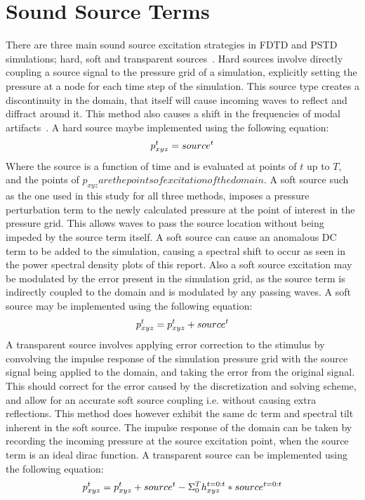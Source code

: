 \section{Sound Source Terms}
There are three main sound source excitation strategies in FDTD and PSTD simulations; hard, soft and transparent sources~\cite{Murphy2014}. Hard sources involve directly coupling a source signal to the pressure grid of a simulation, explicitly setting the pressure at a node for each time step of the simulation. This source type creates a discontinuity in the domain, that itself will cause incoming waves to reflect and diffract around it. This method also causes a shift in the frequencies of modal artifacts~\cite{Murphy2014}. A hard source maybe implemented using the following equation:\\
\begin{equation}
p_{xyz}^{t} = source^{t}\\
\end{equation}
Where the source is a function of time and is evaluated at points of $t$ up to $T$, and the points of $p_{xyz} are the points of excitation of the domain$.
A soft source such as the one used in this study for all three methods, imposes a pressure perturbation term to the newly calculated pressure at the point of interest in the pressure grid. This allows waves to pass the source location without being impeded by the source term itself. A soft source can cause an anomalous DC term to be added to the simulation, causing a spectral shift to occur as seen in the power spectral density plots of this report. Also a soft source excitation may be modulated by the error present in the simulation grid, as the source term is indirectly coupled to the domain and is modulated by any passing waves. A soft source may be implemented using the following equation:\\
\begin{equation}
p_{xyz}^{t} = p_{xyz}^{t} + source^{t}\\
\end{equation}
A transparent source involves applying error correction to the stimulus by convolving the impulse response of the simulation pressure grid with the source signal being applied to the domain, and taking the error from the original signal. This should correct for the error caused by the discretization and solving scheme, and allow for an accurate soft source coupling i.e. without causing extra reflections. This method does however exhibit the same dc term and spectral tilt inherent in the soft source. The impulse response of the domain can be taken by recording the incoming pressure at the source excitation point, when the source term is an ideal dirac function. A transparent source can be implemented using the following equation:\\
\begin{equation}
p_{xyz}^{t} = p_{xyz}^{t} + source^{t} - \Sigma_0^T h_{xyz}^{t = 0 : t}*source^{t = 0 : t}\\
\end{equation}


